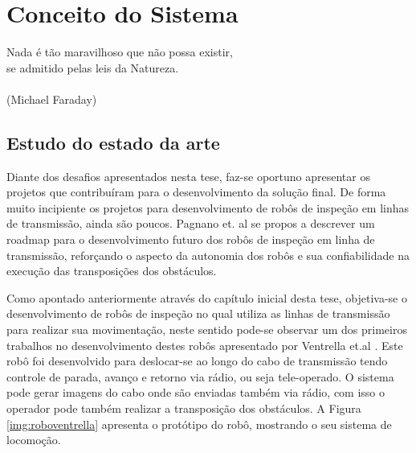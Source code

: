 \chapter{Conceito do Sistema}
\label{chap:concep}
%

\begin{flushright}
  Nada é tão maravilhoso que não possa existir, \\
  se admitido pelas leis da Natureza. \\
  \ \\
  (Michael Faraday)
\end{flushright}



\section{Estudo do estado da arte}
\label{sec:sota}
Diante dos desafios apresentados nesta tese, faz-se oportuno apresentar os projetos que contribuíram para o desenvolvimento da solução final. De forma muito incipiente os projetos para desenvolvimento de robôs de inspeção em linhas de transmissão, ainda são poucos. Pagnano et. al \cite{pagnano2013roadmap} se propos a descrever um roadmap para o desenvolvimento futuro dos robôs de inspeção em linha de transmissão, reforçando o aspecto da autonomia dos robôs e sua confiabilidade na execução das transposições dos obstáculos.

Como apontado anteriormente através do capítulo inicial desta tese, objetiva-se o desenvolvimento de robôs de inspeção no qual utiliza as linhas de transmissão para realizar sua movimentação, neste sentido pode-se observar um dos primeiros trabalhos no desenvolvimento destes robôs apresentado por Ventrella et.al \cite{ventrella2003robo}. Este robô foi desenvolvido para deslocar-se ao longo do cabo de transmissão tendo controle de parada, avanço e retorno via rádio, ou seja tele-operado. O sistema pode gerar imagens do cabo onde são enviadas também via rádio, com isso o operador pode também realizar a transposição dos obstáculos. A Figura \ref{img:roboventrella} apresenta o protótipo do robô, mostrando o seu sistema de locomoção.

